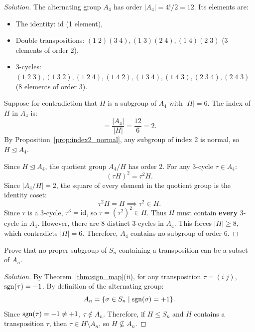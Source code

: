 \begin{proof}[Solution]
The alternating group $A_4$ has order $|A_4| = 4!/2 = 12$.
Its elements are:
\begin{itemize}[leftmargin=1.5em, itemsep=2pt]
    \item The identity: $\text{id}$ (1 element),
    \item Double transpositions: $(1 \; 2)(3 \; 4), (1 \; 3)(2 \; 4), (1 \; 4)(2 \; 3)$ (3 elements of order 2),
    \item 3-cycles: $(1 \; 2 \; 3), (1 \; 3 \; 2), (1 \; 2 \; 4), (1 \; 4 \; 2), (1 \; 3 \; 4), (1 \; 4 \; 3), (2 \; 3 \; 4), (2 \; 4 \; 3)$ (8 elements of order 3).
\end{itemize}

Suppose for contradiction that $H$ is a subgroup of $A_4$ with $|H| = 6$.
The index of $H$ in $A_4$ is:
\begin{equation*}
[A_4 : H] = \frac{|A_4|}{|H|} = \frac{12}{6} = 2.
\end{equation*}
By Proposition~\ref{prop:index2_normal}, any subgroup of index 2 is normal, so $H \trianglelefteq A_4$.

Since $H \trianglelefteq A_4$, the quotient group $A_4/H$ has order 2.
For any 3-cycle $\tau \in A_4$:
\begin{equation*}
(\tau H)^2 = \tau^2 H.
\end{equation*}
Since $|A_4/H| = 2$, the square of every element in the quotient group is the identity coset:
\begin{equation*}
\tau^2 H = H \implies \tau^2 \in H.
\end{equation*}
Since $\tau$ is a 3-cycle, $\tau^3 = \text{id}$, so $\tau = (\tau^2)^2 \in H$.
Thus $H$ must contain \textbf{every} 3-cycle in $A_4$.
However, there are 8 distinct 3-cycles in $A_4$.
This forces $|H| \ge 8$, which contradicts $|H| = 6$.
Therefore, $A_4$ contains no subgroup of order 6.
\end{proof}

\begin{problem}
Prove that no proper subgroup of $S_n$ containing a transposition can be a subset of $A_n$.
\end{problem}

\begin{proof}[Solution]
By Theorem~\ref{thm:sign_map}(ii), for any transposition $\tau = (i \; j)$, $\operatorname{sgn}(\tau) = -1$.
By definition of the alternating group:
\begin{equation*}
A_n = \{ \sigma \in S_n \mid \operatorname{sgn}(\sigma) = +1 \}.
\end{equation*}
Since $\operatorname{sgn}(\tau) = -1 \ne +1$, $\tau \notin A_n$.
Therefore, if $H \le S_n$ and $H$ contains a transposition $\tau$, then $\tau \in H \setminus A_n$, so $H \not\subseteq A_n$.
\end{proof}
